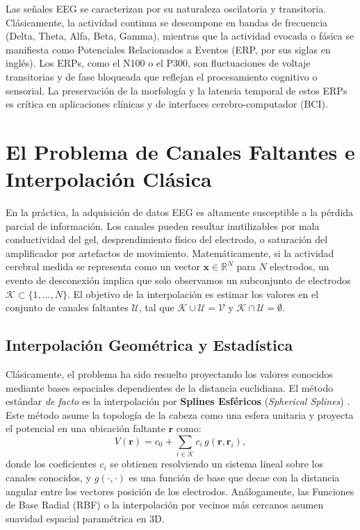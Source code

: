 Las señales EEG se caracterizan por su naturaleza oscilatoria y transitoria. Clásicamente, la actividad continua se descompone en bandas de frecuencia (Delta, Theta, Alfa, Beta, Gamma), mientras que la actividad evocada o fásica se manifiesta como Potenciales Relacionados a Eventos (ERP, por sus siglas en inglés). Los ERPs, como el N100 o el P300, son fluctuaciones de voltaje transitorias y de fase bloqueada que reflejan el procesamiento cognitivo o sensorial. La preservación de la morfología y la latencia temporal de estos ERPs es crítica en aplicaciones clínicas y de interfaces cerebro-computador (BCI).

\section{El Problema de Canales Faltantes e Interpolación Clásica}

En la práctica, la adquisición de datos EEG es altamente susceptible a la pérdida parcial de información. Los canales pueden resultar inutilizables por mala conductividad del gel, desprendimiento físico del electrodo, o saturación del amplificador por artefactos de movimiento. Matemáticamente, si la actividad cerebral medida se representa como un vector $\mathbf{x} \in \mathbb{R}^N$ para $N$ electrodos, un evento de desconexión implica que solo observamos un subconjunto de electrodos $\mathcal{K} \subset \{1, \dots, N\}$. El objetivo de la interpolación es estimar los valores en el conjunto de canales faltantes $\mathcal{U}$, tal que $\mathcal{K} \cup \mathcal{U} = \mathcal{V}$ y $\mathcal{K} \cap \mathcal{U} = \emptyset$.

\subsection{Interpolación Geométrica y Estadística}

Clásicamente, el problema ha sido resuelto proyectando los valores conocidos mediante bases espaciales dependientes de la distancia euclidiana. El método estándar \textit{de facto} es la interpolación por \textbf{Splines Esféricos} (\textit{Spherical Splines}) \cite{perrin_spherical_1989}. Este método asume la topología de la cabeza como una esfera unitaria y proyecta el potencial en una ubicación faltante $\mathbf{r}$ como:
\begin{equation}
    V(\mathbf{r}) = c_0 + \sum_{i \in \mathcal{K}} c_i \, g(\mathbf{r}, \mathbf{r}_i),
\end{equation}
donde los coeficientes $c_i$ se obtienen resolviendo un sistema lineal sobre los canales conocidos, y $g(\cdot, \cdot)$ es una función de base que decae con la distancia angular entre los vectores posición de los electrodos. Análogamente, las Funciones de Base Radial (RBF) \cite{jager_reconstruction_2016} o la interpolación por vecinos más cercanos asumen suavidad espacial paramétrica en 3D.

